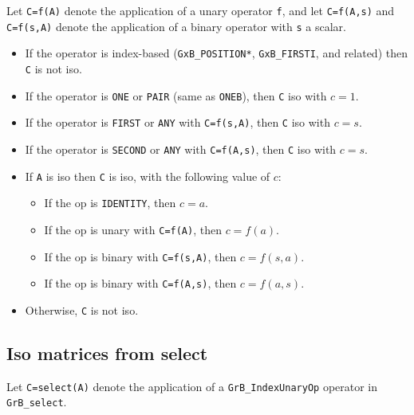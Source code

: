 Let \verb'C=f(A)' denote the application of a unary operator \verb'f',
and let \verb'C=f(A,s)' and \verb'C=f(s,A)' denote the application of a binary
operator with \verb's' a scalar.

    \begin{itemize}
    \item If the operator is index-based (\verb'GxB_POSITION*',
    \verb'GxB_FIRSTI', and related) then \verb'C' is not iso.

    \item If the operator is \verb'ONE' or \verb'PAIR' (same as \verb'ONEB'),
        then \verb'C' iso with $c=1$.

    \item If the operator is \verb'FIRST' or \verb'ANY' with \verb'C=f(s,A)',
        then \verb'C' iso with $c=s$.

    \item If the operator is \verb'SECOND' or \verb'ANY' with \verb'C=f(A,s)',
        then \verb'C' iso with $c=s$.

    \item If \verb'A' is iso then \verb'C' is iso, with the following value
        of $c$:

        \begin{itemize}
        \item If the op is \verb'IDENTITY', then $c=a$.
        \item If the op is unary with \verb'C=f(A)', then $c=f(a)$.
        \item If the op is binary with \verb'C=f(s,A)', then $c=f(s,a)$.
        \item If the op is binary with \verb'C=f(A,s)', then $c=f(a,s)$.
        \end{itemize}


    \item Otherwise, \verb'C' is not iso.
    \end{itemize}

\subsection{Iso matrices from select}
\label{iso_select}

Let \verb'C=select(A)' denote the application of a \verb'GrB_IndexUnaryOp' operator
in \verb'GrB_select'.

